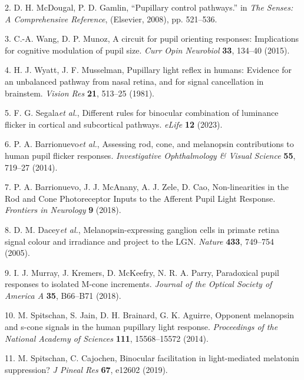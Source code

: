 \documentclass[
]{article}
\begin{document}
\leavevmode\hypertarget{ref-McDougal2008}{}%
2. D. H. McDougal, P. D. Gamlin, ``Pupillary control pathways.'' in \emph{The Senses: A Comprehensive Reference}, (Elsevier, 2008), pp. 521--536.

\leavevmode\hypertarget{ref-Wang2015}{}%
3. C.-A. Wang, D. P. Munoz, A circuit for pupil orienting responses: Implications for cognitive modulation of pupil size. \emph{Curr Opin Neurobiol} \textbf{33}, 134--40 (2015).

\leavevmode\hypertarget{ref-Wyatt1981}{}%
4. H. J. Wyatt, J. F. Musselman, Pupillary light reflex in humans: Evidence for an unbalanced pathway from nasal retina, and for signal cancellation in brainstem. \emph{Vision Res} \textbf{21}, 513--25 (1981).

\leavevmode\hypertarget{ref-Segala2023}{}%
5. F. G. Segala\emph{et al.}, Different rules for binocular combination of luminance flicker in cortical and subcortical pathways. \emph{eLife} \textbf{12} (2023).

\leavevmode\hypertarget{ref-Barrionuevo2014}{}%
6. P. A. Barrionuevo\emph{et al.}, Assessing rod, cone, and melanopsin contributions to human pupil flicker responses. \emph{Investigative Ophthalmology \& Visual Science} \textbf{55}, 719--27 (2014).

\leavevmode\hypertarget{ref-Barrionuevo2018}{}%
7. P. A. Barrionuevo, J. J. McAnany, A. J. Zele, D. Cao, Non-linearities in the Rod and Cone Photoreceptor Inputs to the Afferent Pupil Light Response. \emph{Frontiers in Neurology} \textbf{9} (2018).

\leavevmode\hypertarget{ref-Dacey2005}{}%
8. D. M. Dacey\emph{et al.}, Melanopsin-expressing ganglion cells in primate retina signal colour and irradiance and project to the LGN. \emph{Nature} \textbf{433}, 749--754 (2005).

\leavevmode\hypertarget{ref-Murray2018}{}%
9. I. J. Murray, J. Kremers, D. McKeefry, N. R. A. Parry, Paradoxical pupil responses to isolated M-cone increments. \emph{Journal of the Optical Society of America A} \textbf{35}, B66--B71 (2018).

\leavevmode\hypertarget{ref-Spitschan2014}{}%
10. M. Spitschan, S. Jain, D. H. Brainard, G. K. Aguirre, Opponent melanopsin and s-cone signals in the human pupillary light response. \emph{Proceedings of the National Academy of Sciences} \textbf{111}, 15568--15572 (2014).

\leavevmode\hypertarget{ref-Spitschan2019}{}%
11. M. Spitschan, C. Cajochen, Binocular facilitation in light-mediated melatonin suppression? \emph{J Pineal Res} \textbf{67}, e12602 (2019).
\end{document}
